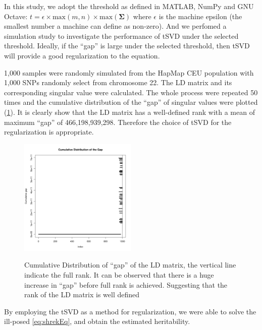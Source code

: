 			In this study, we adopt the threshold as defined in MATLAB, NumPy and GNU Octave: $t=\epsilon\times\mathrm{max}(m,n)\times\mathrm{max}(\boldsymbol{\Sigma})$ where $\epsilon$ is the machine epsilon (the smallest number a machine can define as non-zero). 
			And we perfomed a simulation study to investigate the performance of \gls{tSVD} under the selected threshold.
			Ideally, if the ``gap'' is large under the selected threshold, then \gls{tSVD} will provide a good regularization to the equation. 
			
			1,000 samples were randomly simulated from the HapMap\citep{Altshuler2010} \acrshort{CEU} population with
			1,000 \glspl{SNP} randomly select from chromosome 22. 
			The \gls{LD} matrix and its corresponding singular value were calculated. 
			The whole process were repeated 50 times and the cumulative distribution of the ``gap'' of singular values were plotted (\cref{fig:singularValueDist}). 
			It is clearly show that the \gls{LD} matrix has a well-defined rank with a mean of maximum ``gap'' of 466,198,939,298.
			Therefore the choice of \gls{tSVD} for the regularization is appropriate.
			\begin{figure}
				\caption[Cumulative Distribution of ``gap'' of the LD matrix]{Cumulative Distribution of ``gap'' of the LD matrix, the vertical line indicate the full rank. It can be observed that there is a huge increase in ``gap'' before full rank is achieved. Suggesting that the rank of the LD matrix is well defined}
				\centering
				\includegraphics[width=0.5\textwidth]{figure/singular_value_distribution.png}
				\label{fig:singularValueDist}
				\vspace{-20pt}
			\end{figure}
			
			By employing the \gls{tSVD} as a method for regularization, we were able to solve the ill-posed \cref{eq:shrekEq}, and obtain the estimated heritability.
						
